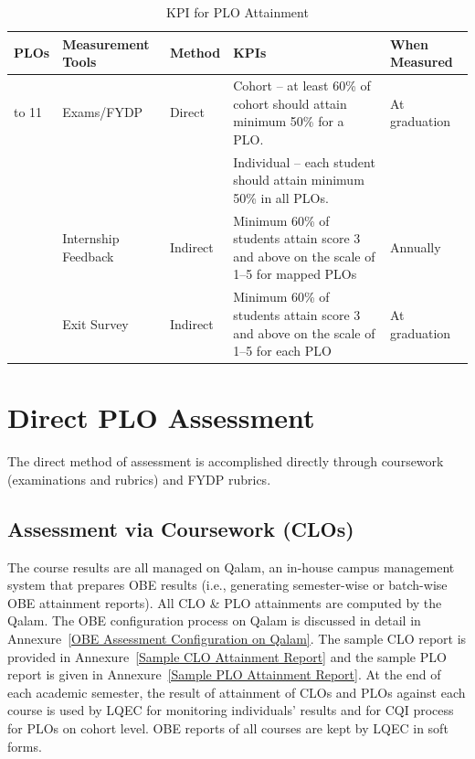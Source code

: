 \begin{table}[H]
\centering
\setlength{\tabcolsep}{3pt}
\caption{KPI for PLO Attainment}
\footnotesize
\begin{tabular}{>{\raggedright\arraybackslash}p{}
                >{\raggedright\arraybackslash}p{}
                >{\centering\arraybackslash}p{}
                >{\raggedright\arraybackslash}p{}
                >{\raggedright\arraybackslash}p{}}
\toprule
\textbf{PLOs} & \textbf{Measurement Tools} & \textbf{Method} & \textbf{KPIs} & \textbf{When Measured} \\
\midrule
1 to 11 & Exams/FYDP & Direct &
Cohort -- at least 60\% of cohort should attain minimum 50\% for a PLO. & At graduation\\
&&&Individual -- each student should attain minimum 50\% in all PLOs. &  \\
\addlinespace
 & Internship Feedback & Indirect &
Minimum 60\% of students attain score 3 and above on the scale of 1--5 for mapped PLOs & Annually \\
\addlinespace
 & Exit Survey & Indirect &
Minimum 60\% of students attain score 3 and above on the scale of 1--5 for each PLO & At graduation \\
\bottomrule
\end{tabular}
\label{table: KPI for PLO attainment}
\end{table}

\hypertarget{sec:directassess}{%
\section{Direct PLO Assessment}\label{sec:directassess}}

The direct method of assessment is accomplished directly through coursework (examinations and rubrics) and FYDP rubrics.

\subsection{Assessment via Coursework (CLOs)}

The course results are all managed on Qalam, an in-house campus management system that prepares OBE results (i.e., generating semester-wise or batch-wise OBE attainment reports). All CLO \& PLO attainments are computed by the Qalam. The OBE configuration process on Qalam is discussed in detail in Annexure~\ref{OBE Assessment Configuration on Qalam}. The sample CLO report is provided in Annexure~\ref{Sample CLO Attainment Report} and the sample PLO report is given in Annexure~\ref{Sample PLO Attainment Report}. At the end of each academic semester, the result of attainment of CLOs and PLOs against each course is used by LQEC for monitoring individuals' results and for CQI process for PLOs on cohort level. OBE reports of all courses are kept by LQEC in soft forms.


